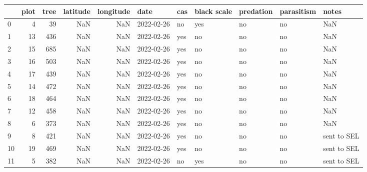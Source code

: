 \begin{tabular}{lrrrrllllll}
\toprule
{} &  plot &  tree &  latitude &  longitude &        date &  cas & black scale & predation & parasitism &        notes \\
\midrule
0  &     4 &    39 &       NaN &        NaN &  2022-02-26 &   no &         yes &        no &         no &          NaN \\
1  &    13 &   436 &       NaN &        NaN &  2022-02-26 &  yes &          no &        no &         no &          NaN \\
2  &    15 &   685 &       NaN &        NaN &  2022-02-26 &  yes &          no &        no &         no &          NaN \\
3  &    16 &   503 &       NaN &        NaN &  2022-02-26 &  yes &          no &        no &         no &          NaN \\
4  &    17 &   439 &       NaN &        NaN &  2022-02-26 &  yes &          no &        no &         no &          NaN \\
5  &    14 &   472 &       NaN &        NaN &  2022-02-26 &  yes &          no &        no &         no &          NaN \\
6  &    18 &   464 &       NaN &        NaN &  2022-02-26 &  yes &          no &        no &         no &          NaN \\
7  &    12 &   458 &       NaN &        NaN &  2022-02-26 &  yes &          no &        no &         no &          NaN \\
8  &     6 &   373 &       NaN &        NaN &  2022-02-26 &  yes &          no &        no &         no &          NaN \\
9  &     8 &   421 &       NaN &        NaN &  2022-02-26 &  yes &          no &        no &         no &  sent to SEL \\
10 &    19 &   469 &       NaN &        NaN &  2022-02-26 &  yes &          no &        no &         no &  sent to SEL \\
11 &     5 &   382 &       NaN &        NaN &  2022-02-26 &   no &         yes &        no &         no &  sent to SEL \\
\bottomrule
\end{tabular}
